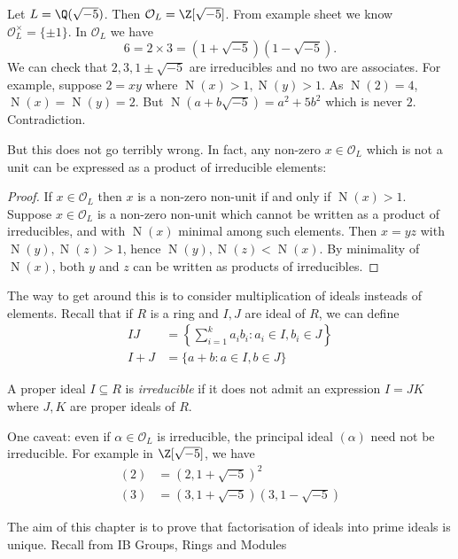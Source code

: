 \documentclass[a4paper]{article}
\renewcommand*{\O}{\mathcal{O}}
\DeclareMathOperator{\n}{N}
\begin{document}
\begin{eg}
  Let \(L = \Q(\sqrt{-5})\). Then \(\O_L = \Z[\sqrt{-5}]\). From example sheet we know \(\O_L^\times = \{\pm 1\}\). In \(\O_L\) we have
  \[
    6 = 2 \times 3 = (1 + \sqrt{-5})(1 - \sqrt{-5}).
  \]
  We can check that \(2, 3, 1 \pm \sqrt{-5}\) are irreducibles and no two are associates. For example, suppose \(2 = xy\) where \(\n(x) > 1, \n(y) > 1\). As \(\n(2) = 4\), \(\n(x) = \n(y) = 2\). But \(\n(a + b\sqrt{-5}) = a^2 + 5b^2\) which is never \(2\). Contradiction.
\end{eg}

But this does not go terribly wrong. In fact, any non-zero \(x \in \O_L\) which is not a unit can be expressed as a product of irreducible elements:

\begin{proof}
  If \(x \in \O_L\) then \(x\) is a non-zero non-unit if and only if \(\n(x) > 1\). Suppose \(x \in \O_L\) is a non-zero non-unit which cannot be written as a product of irreducibles, and with \(\n(x)\) minimal among such elements. Then \(x = yz\) with \(\n(y), \n(z) > 1\), hence \(\n(y), \n(z) < \n(x)\). By minimality of \(\n(x)\), both \(y\) and \(z\) can be written as products of irreducibles.
\end{proof}

The way to get around this is to consider multiplication of ideals insteads of elements. Recall that if \(R\) is a ring and \(I, J\) are ideal of \(R\), we can define
\begin{align*}
  IJ &= \left\{ \sum_{i = 1}^k a_ib_i: a_i \in I, b_i \in J \right\} \\
  I + J &= \{ a + b: a \in I, b \in J \}
\end{align*}

\begin{definition}
  A proper ideal \(I \subseteq R\) is \emph{irreducible} if it does not admit an expression \(I = JK\) where \(J, K\) are proper ideals of \(R\).
\end{definition}

One caveat: even if \(\alpha \in \O_L\) is irreducible, the principal ideal \((\alpha)\) need not be irreducible. For example in \(\Z[\sqrt{-5}]\), we have
\begin{align*}
  (2) &= (2, 1 + \sqrt{-5})^2 \\
  (3) &= (3, 1 + \sqrt{-5})(3, 1 - \sqrt{-5})
\end{align*}

The aim of this chapter is to prove that factorisation of ideals into prime ideals is unique. Recall from IB Groups, Rings and Modules
\end{document}
